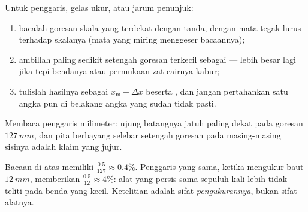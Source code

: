 \begin{method}\label{met:g10:orders-of-magnitude:reading}
Untuk penggaris, gelas ukur, atau jarum penunjuk:
\begin{enumerate}
  \item bacalah goresan skala yang terdekat dengan tanda, dengan mata
        tegak lurus terhadap skalanya (mata yang miring menggeser
        bacaannya);
  \item ambillah paling sedikit setengah goresan terkecil sebagai
         --- lebih besar lagi jika tepi bendanya
        atau permukaan zat cairnya kabur;
  \item tulislah hasilnya sebagai $x_{\text{m}} \pm \Delta x$ beserta
        , dan jangan pertahankan satu angka pun di belakang
        angka yang sudah tidak pasti.
\end{enumerate}
\end{method}

\begin{omfigure}

{\small Membaca penggaris milimeter: ujung batangnya jatuh paling dekat
pada goresan $\qty{127}{mm}$, dan pita berbayang selebar setengah
goresan pada masing-masing sisinya adalah klaim yang jujur.}
\end{omfigure}

\begin{example}\label{ex:g10:orders-of-magnitude:reading}
Bacaan di atas memiliki 
$\frac{0.5}{127} \approx 0.4\%$. Penggaris yang sama, ketika mengukur
baut $\qty{12}{mm}$, memberikan $\frac{0.5}{12} \approx 4\%$: alat yang
persis sama sepuluh kali lebih tidak teliti pada benda yang kecil.
Ketelitian adalah sifat \emph{pengukurannya}, bukan sifat alatnya.
\end{example}

